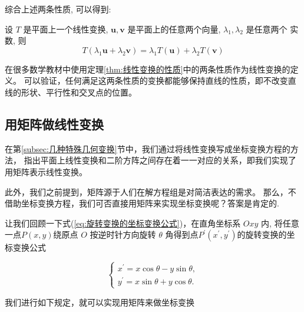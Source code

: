 \documentclass[lang=cn,newtx,10pt,scheme=chinese]{elegantbook}
\begin{document}
综合上述两条性质, 可以得到:

设 $T$ 是平面上一个线性变换, $\boldsymbol{u}, \boldsymbol{v}$ 是平面上的任意两个向量, $\lambda_1, \lambda_2$ 是任意两个 实数, 则
\begin{equation}
  T\left(\lambda_1 \boldsymbol{u}+\lambda_2 \boldsymbol{v}\right)=\lambda_1 T (\boldsymbol{u})+\lambda_2 T (\boldsymbol{v})
\end{equation}

\begin{note}
  在很多数学教材中使用定理\ref{thm:线性变换的性质}中的两条性质作为线性变换的定义。
  可以验证，任何满足这两条性质的变换都能够保持直线的性质，即不改变直线的形状、平行性和交叉点的位置。
\end{note}

\subsection{用矩阵做线性变换}

在第\ref{subsec:几种特殊几何变换}节中，我们通过将线性变换写成坐标变换方程的方法，
指出平面上线性变换和二阶方阵之间存在着一一对应的关系，即我们实现了用矩阵表示线性变换。

此外，我们之前提到，矩阵源于人们在解方程组是对简洁表达的需求。
那么，不借助坐标变换方程，我们可否直接用矩阵来实现坐标变换呢？答案是肯定的.

让我们回顾一下式(\ref{eq:旋转变换的坐标变换公式})，在直角坐标系 $O x y$ 内, 
将任意一点$P(x, y)$绕原点 $O$ 按逆时针方向旋转 $\theta$ 角得到点$P^{\prime}(x^{\prime}, y^{\prime})$的旋转变换的坐标变换公式

\begin{equation*}
  \left\{\begin{array}{l}
  x^{\prime}=x \cos \theta-y \sin \theta, \\
  y^{\prime}=x \sin \theta+y \cos \theta .
  \end{array}\right.    
\end{equation*}

我们进行如下规定，就可以实现用矩阵来做坐标变换


\end{document}

